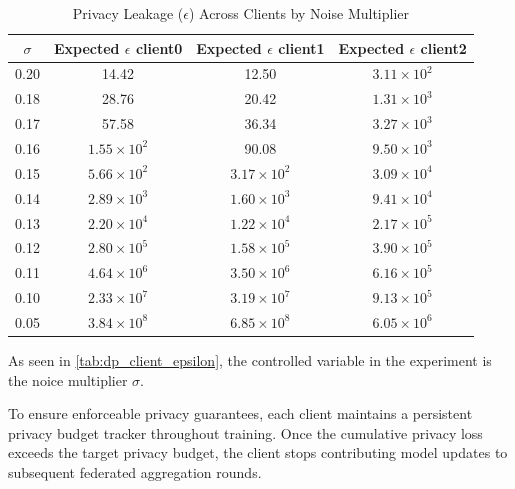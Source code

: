 \documentclass[conference]{IEEEtran}
\begin{document}
\begin{table}[ht]
    \centering
    \renewcommand{\arraystretch}{1.3}
    \begin{tabular}{|c|c|c|c|}
        \hline
        \textbf{$\sigma$} & \thead{\textbf{Expected $\epsilon$} \\ \textbf{client0}} & \thead{\textbf{Expected $\epsilon$} \\ \textbf{client1}} & \thead{\textbf{Expected $\epsilon$} \\ \textbf{client2}} \\ \hline
        0.20 & 14.42 & 12.50 & $3.11 \times 10^2$ \\ \hline
        0.18 & 28.76 & 20.42 & $1.31 \times 10^3$ \\ \hline
        0.17 & 57.58 & 36.34 & $3.27 \times 10^3$ \\ \hline
        0.16 & $1.55 \times 10^2$ & 90.08 & $9.50 \times 10^3$ \\ \hline
        0.15 & $5.66 \times 10^2$ & $3.17 \times 10^2$ & $3.09 \times 10^4$ \\ \hline
        0.14 & $2.89 \times 10^3$ & $1.60 \times 10^3$ & $9.41 \times 10^4$ \\ \hline
        0.13 & $2.20 \times 10^4$ & $1.22 \times 10^4$ & $2.17 \times 10^5$ \\ \hline
        0.12 & $2.80 \times 10^5$ & $1.58 \times 10^5$ & $3.90 \times 10^5$ \\ \hline
        0.11 & $4.64 \times 10^6$ & $3.50 \times 10^6$ & $6.16 \times 10^5$ \\ \hline
        0.10 & $2.33 \times 10^7$ & $3.19 \times 10^7$ & $9.13 \times 10^5$ \\ \hline
        0.05 & $3.84 \times 10^8$ & $6.85 \times 10^8$ & $6.05 \times 10^6$ \\ \hline
    \end{tabular}
    \caption{Privacy Leakage ($\epsilon$) Across Clients by Noise Multiplier}
    \label{tab:dp_client_epsilon}
\end{table}

As seen in \autoref{tab:dp_client_epsilon}, the controlled variable in the experiment is the noice multiplier $\sigma$.

To ensure enforceable privacy guarantees, each client maintains a persistent privacy budget tracker throughout training. Once the cumulative privacy loss exceeds the target privacy budget, the client stops contributing model updates to subsequent federated aggregation rounds.
\end{document}

